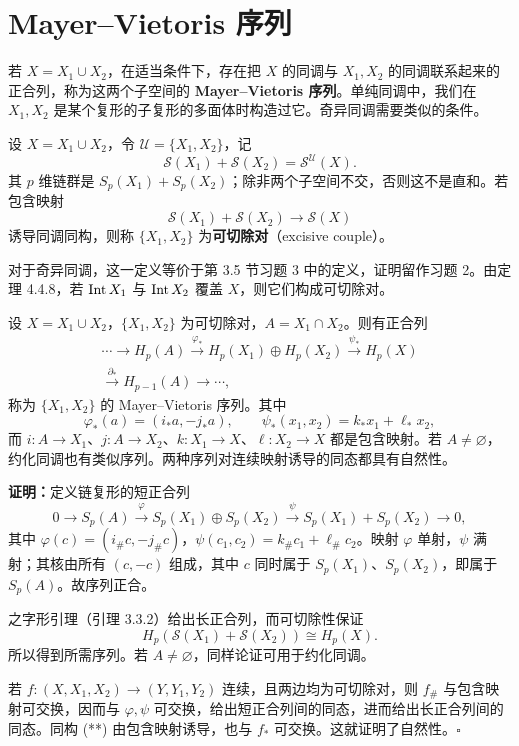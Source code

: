 \section{Mayer--Vietoris 序列}
若 $X=X_1\cup X_2$，在适当条件下，存在把 $X$ 的同调与 $X_1,X_2$ 的同调联系起来的正合列，称为这两个子空间的 \textbf{Mayer--Vietoris 序列}。单纯同调中，我们在 $X_1,X_2$ 是某个复形的子复形的多面体时构造过它。奇异同调需要类似的条件。

设 $X=X_1\cup X_2$，令 $\mathcal U=\{X_1,X_2\}$，记
\[
\mathcal S(X_1)+\mathcal S(X_2)=\mathcal S^{\mathcal U}(X).
\]
其 $p$ 维链群是 $S_p(X_1)+S_p(X_2)$；除非两个子空间不交，否则这不是直和。若包含映射
\[
\mathcal S(X_1)+\mathcal S(X_2)\longrightarrow\mathcal S(X)
\]
诱导同调同构，则称 $\{X_1,X_2\}$ 为\textbf{可切除对}（excisive couple）。

对于奇异同调，这一定义等价于第 3.5 节习题 3 中的定义，证明留作习题 2。由定理 4.4.8，若 $\operatorname{Int} X_1$ 与 $\operatorname{Int} X_2$ 覆盖 $X$，则它们构成可切除对。

设 $X=X_1\cup X_2$，$\{X_1,X_2\}$ 为可切除对，$A=X_1\cap X_2$。则有正合列
\[
\begin{split}
\cdots\longrightarrow H_p(A)\xrightarrow{\varphi_*}H_p(X_1)\oplus H_p(X_2)
\xrightarrow{\psi_*}H_p(X)\\
\xrightarrow{\partial_*}H_{p-1}(A)\longrightarrow\cdots,
\end{split}
\]
称为 $\{X_1,X_2\}$ 的 Mayer--Vietoris 序列。其中
\[
\varphi_*(a)=(i_*a,-j_*a),\qquad \psi_*(x_1,x_2)=k_*x_1+\ell_*x_2,
\]
而 $i:A\to X_1$、$j:A\to X_2$、$k:X_1\to X$、$\ell:X_2\to X$ 都是包含映射。若 $A\ne\varnothing$，约化同调也有类似序列。两种序列对连续映射诱导的同态都具有自然性。

\textbf{证明：}定义链复形的短正合列
\[
0\longrightarrow S_p(A)\xrightarrow{\varphi}S_p(X_1)\oplus S_p(X_2)
\xrightarrow{\psi}S_p(X_1)+S_p(X_2)\longrightarrow0,\tag{*}
\]
其中 $\varphi(c)=(i_\#c,-j_\#c)$，$\psi(c_1,c_2)=k_\#c_1+\ell_\#c_2$。映射 $\varphi$ 单射，$\psi$ 满射；其核由所有 $(c,-c)$ 组成，其中 $c$ 同时属于 $S_p(X_1)$、$S_p(X_2)$，即属于 $S_p(A)$。故序列正合。

之字形引理（引理 3.3.2）给出长正合列，而可切除性保证
\[
H_p(\mathcal S(X_1)+\mathcal S(X_2))\cong H_p(X).\tag{**}
\]
所以得到所需序列。若 $A\ne\varnothing$，同样论证可用于约化同调。

若 $f:(X,X_1,X_2)\to(Y,Y_1,Y_2)$ 连续，且两边均为可切除对，则 $f_\#$ 与包含映射可交换，因而与 $\varphi,\psi$ 可交换，给出短正合列间的同态，进而给出长正合列间的同态。同构 (**) 由包含映射诱导，也与 $f_*$ 可交换。这就证明了自然性。\hfill$\square$

